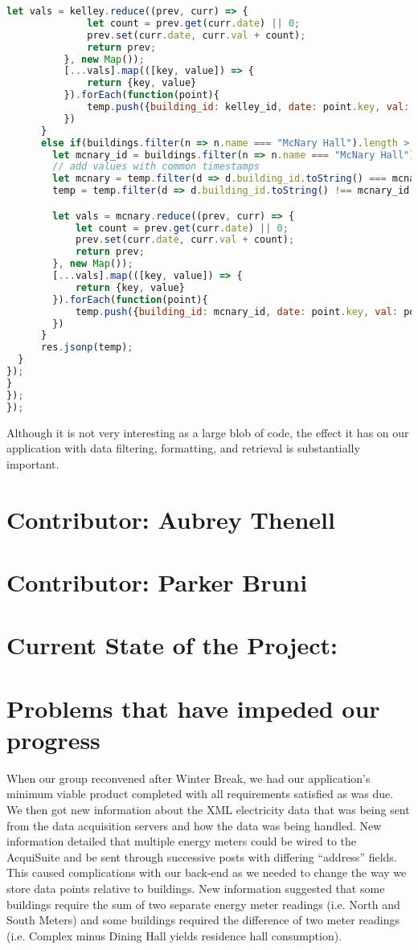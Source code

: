 \documentclass[letterpaper,10pt,serif,draftclsnofoot,onecolumn,compsoc,titlepage]{IEEEtran}
\begin{document}
\begin{lstlisting}[language=JavaScript]
          let vals = kelley.reduce((prev, curr) => {
              let count = prev.get(curr.date) || 0;
              prev.set(curr.date, curr.val + count);
              return prev;
          }, new Map());
          [...vals].map(([key, value]) => {
              return {key, value}
          }).forEach(function(point){
              temp.push({building_id: kelley_id, date: point.key, val: point.value})
          })
      }
      else if(buildings.filter(n => n.name === "McNary Hall").length > 0){
        let mcnary_id = buildings.filter(n => n.name === "McNary Hall")[0].building_id;
        // add values with common timestamps
        let mcnary = temp.filter(d => d.building_id.toString() === mcnary_id.toString());
        temp = temp.filter(d => d.building_id.toString() !== mcnary_id.toString());

        let vals = mcnary.reduce((prev, curr) => {
            let count = prev.get(curr.date) || 0;
            prev.set(curr.date, curr.val + count);
            return prev;
        }, new Map());
        [...vals].map(([key, value]) => {
            return {key, value}
        }).forEach(function(point){
            temp.push({building_id: mcnary_id, date: point.key, val: point.value})
        })
      }
      res.jsonp(temp);
  }
});
}
});
});
\end{lstlisting}

Although it is not very interesting as a large blob of code, the effect it has on our application with data filtering, formatting, and retrieval is substantially important.
\section{Contributor: Aubrey Thenell}

\section{Contributor: Parker Bruni}

\section{Current State of the Project:} 

\section{Problems that have impeded our progress}
When our group reconvened after Winter Break, we had our application's minimum viable product completed with all requirements satisfied as was due. We then got new information about the XML electricity data that was being sent from the data acquisition servers and how the data was being handled. New information detailed that multiple energy meters could be wired to the AcquiSuite and be sent through successive posts with differing ``address'' fields. This caused complications with our back-end as we needed to change the way we store data points relative to buildings. New information suggested that some buildings require the sum of two separate energy meter readings (i.e. North and South Meters) and some buildings required the difference of two meter readings (i.e. Complex minus Dining Hall yields residence hall consumption).
\end{document}

